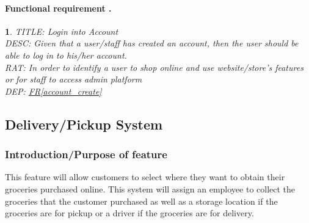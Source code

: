 \documentclass{scrreprt}
\theoremstyle{funreq}
\newtheorem{funreq}{}
\newcommand*{\reqref}[1]{\hyperref[#1]{FR\ref*{#1}}}
\begin{document}
	\paragraph[]{Functional requirement .}
	\begin{funreq}
		\label{account_login}
		TITLE: Login into Account\\
		DESC: Given that a user/staff has created an account, then the user should be able to log in to his/her account.\\
		RAT: In order to identify a user to shop online and use website/store’s features or for staff to access admin platform\\
		DEP: \reqref{account_create}
	\end{funreq}
	
	
	\subsection{Delivery/Pickup System}
	\subsubsection{Introduction/Purpose of feature}
	This feature will allow customers to select where they want to obtain their groceries purchased online.  This system will assign an employee to collect the groceries that the customer purchased as well as a storage location if the groceries are for pickup or a driver if the groceries are for delivery.
\end{document}
